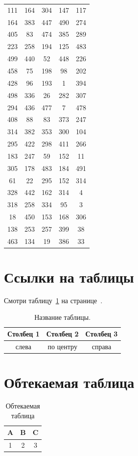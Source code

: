 \documentclass[a4paper,12pt]{article}
\begin{document}
\begin{longtable}{|c|c|c|c|c|}
  111 & 164 & 304 & 147 & 117 \\
  164 & 383 & 447 & 490 & 274 \\
  405 & 83 & 474 & 385 & 289 \\
  223 & 258 & 194 & 125 & 483 \\
  499 & 440 & 52 & 448 & 226 \\
  458 & 75 & 198 & 98 & 202 \\
  428 & 96 & 193 & 1 & 394 \\
  498 & 336 & 26 & 282 & 307 \\
  294 & 436 & 477 & 7 & 478 \\
  408 & 88 & 83 & 373 & 247 \\
  314 & 382 & 353 & 300 & 104 \\
  295 & 422 & 298 & 411 & 266 \\
  183 & 247 & 59 & 152 & 11 \\
  305 & 178 & 483 & 184 & 491 \\
  61 & 22 & 295 & 152 & 314 \\
  328 & 442 & 162 & 314 & 4 \\
  318 & 258 & 334 & 95 & 3 \\
  18 & 450 & 153 & 168 & 306 \\
  138 & 253 & 257 & 399 & 38 \\
  463 & 134 & 19 & 386 & 33 \\
\end{longtable}

\section{Ссылки на таблицы}

Смотри таблицу~\ref{tab:mytab} на странице~\pageref{tab:mytab}.

\begin{table}[!h]
  \centering
  \caption{Название таблицы.}
  \label{tab:mytab}
  \begin{tabular}{|c|c|c|}
    \hline
    Столбец 1 & Столбец 2 & Столбец 3 \\
    \hline
    слева & по центру & справа \\
    \hline
  \end{tabular}
\end{table}

\section{Обтекаемая таблица}

\lipsum[1-2]

\begin{table}
  \centering
  \caption{Обтекаемая таблица}
  \begin{tabular}{|c|c|c|}
    \hline
    A & B & C \\
    \hline
    1 & 2 & 3 \\
    \hline
  \end{tabular}
\end{table}

\lipsum[3-4]

\listoftables
\end{document}

